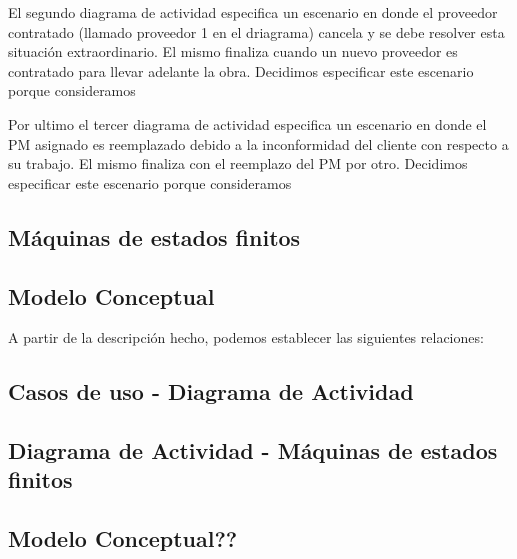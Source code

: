 El segundo diagrama de actividad especifica un escenario en donde el proveedor contratado (llamado proveedor 1 en el driagrama) cancela y se debe resolver esta situación extraordinario. El mismo finaliza cuando un nuevo proveedor es contratado para llevar adelante la obra. Decidimos especificar este escenario porque consideramos

Por ultimo el tercer diagrama de actividad especifica un escenario en donde el PM asignado es reemplazado debido a la inconformidad del cliente con respecto a su trabajo. El mismo finaliza con el reemplazo del PM por otro. Decidimos especificar este escenario porque consideramos

\subsection{Máquinas de estados finitos}

\subsection{Modelo Conceptual}

A partir de la descripción hecho, podemos establecer las siguientes relaciones:
\subsection{Casos de uso - Diagrama de Actividad}

\subsection{Diagrama de Actividad - Máquinas de estados finitos}

\subsection{Modelo Conceptual??}
